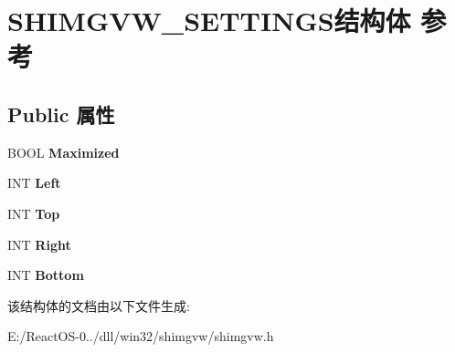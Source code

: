 \hypertarget{struct_s_h_i_m_g_v_w___s_e_t_t_i_n_g_s}{}\section{S\+H\+I\+M\+G\+V\+W\+\_\+\+S\+E\+T\+T\+I\+N\+G\+S结构体 参考}
\label{struct_s_h_i_m_g_v_w___s_e_t_t_i_n_g_s}
\subsection*{Public 属性}
\begin{DoxyCompactItemize}
\item 
\mbox{\label{struct_s_h_i_m_g_v_w___s_e_t_t_i_n_g_s_a6038281589252855e214c825c15432e4}} 
B\+O\+OL {\bfseries Maximized}
\item 
\mbox{\label{struct_s_h_i_m_g_v_w___s_e_t_t_i_n_g_s_a13e9137c34d82bc06d6f1284c2f0e8e0}} 
I\+NT {\bfseries Left}
\item 
\mbox{\label{struct_s_h_i_m_g_v_w___s_e_t_t_i_n_g_s_aa67755b369b793bd32ff557e5194feec}} 
I\+NT {\bfseries Top}
\item 
\mbox{\label{struct_s_h_i_m_g_v_w___s_e_t_t_i_n_g_s_af4289efa8c1e5e34d7ae6792d9294402}} 
I\+NT {\bfseries Right}
\item 
\mbox{\label{struct_s_h_i_m_g_v_w___s_e_t_t_i_n_g_s_a080dda5ea4695c01bf84c6edfeff53de}} 
I\+NT {\bfseries Bottom}
\end{DoxyCompactItemize}


该结构体的文档由以下文件生成\+:\begin{DoxyCompactItemize}
\item 
E\+:/\+React\+O\+S-\/0../dll/win32/shimgvw/shimgvw.\+h\end{DoxyCompactItemize}

